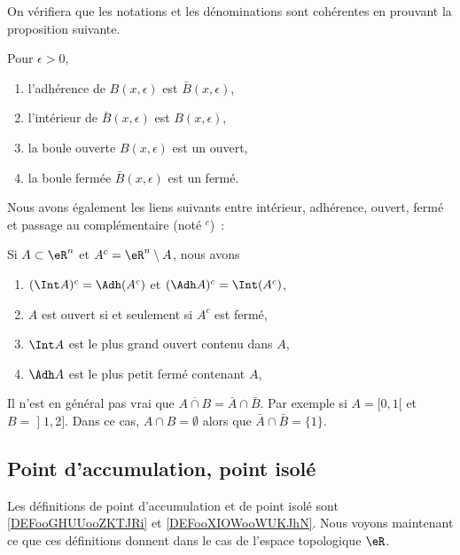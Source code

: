 On vérifiera que les notations et les dénominations sont cohérentes en prouvant la proposition suivante.
\begin{proposition}Pour $\epsilon > 0$,
  \begin{enumerate}
  \item l'adhérence de $B(x,\epsilon)$ est $\bar B(x,\epsilon)$,
  \item l'intérieur de $\bar B(x,\epsilon)$ est $B(x,\epsilon)$,
  \item la boule ouverte $B(x,\epsilon)$ est un ouvert,
  \item la boule fermée $\bar B(x,\epsilon)$ est un fermé.
  \end{enumerate}
\end{proposition}

Nous avons également les liens suivants entre intérieur, adhérence, ouvert, fermé et passage au complémentaire (noté ${}^c$)~:
\begin{proposition}
Si $A \subset \eR^n$ et $A^c = \eR^n\setminus A$, nous
  avons
  \begin{enumerate}
  \item $(\Int A)^c = \Adh (A^c)$ et $(\Adh A)^c = \Int
    (A^c)$,
  \item $A$ est ouvert si et seulement si $A^c$ est fermé,
  \item $\Int A$ est le plus grand ouvert contenu dans $A$,
  \item $\Adh A$ est le plus petit fermé contenant $A$,
  \end{enumerate}
\end{proposition}

\begin{example} \label{ExBFLooUNyvbw}
    Il n'est en général pas vrai que \( \overline{ A\cap B }=\bar A\cap \bar B\). Par exemple si \( A=\mathopen[ 0 , 1 [\) et \( B=\mathopen] 1 , 2 \mathclose]\). Dans ce cas, \( A\cap B=\emptyset\) alors que \( \bar A\cap\bar B=\{ 1 \}\).
\end{example}

\subsection{Point d'accumulation, point isolé}

Les définitions de point d'accumulation et de point isolé sont \ref{DEFooGHUUooZKTJRi} et \ref{DEFooXIOWooWUKJhN}. Nous voyons maintenant ce que ces définitions donnent dans le cas de l'espace topologique \( \eR\).

